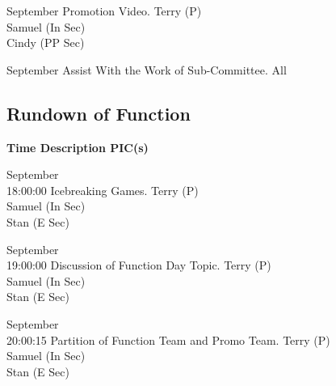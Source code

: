 \bTR{}
\eTD{} September
\eTD\bTD Promotion Video.
\eTD\bTD Terry (P) \\ Samuel (In Sec) \\ Cindy (PP Sec)
\eTD\eTR

\bTR{}
\eTD{} September
\eTD\bTD Assist With the Work of Sub-Committee.
\eTD\bTD All
\eTD\eTR

\eTABLEbody
\eTABLE

\pagebreak
\subsection{Rundown of Function}

\setupTABLE[c][1][width=1.25in]
\setupTABLE[c][2][width=3.5in]
\setupTABLE[c][3][width=1.25in]
\bTABLE
\bTABLEhead

\bTR\bTH    \bf{Time}
\eTH\bTH    \bf{Description}
\eTH\bTH    \bf{PIC(s)}
\eTH\eTR

\eTABLEhead
\bTABLEbody

\bTR{} September \\ 18:00:00
\eTD\bTD Icebreaking Games.
\eTD\bTD Terry (P) \\ Samuel (In Sec) \\ Stan (E Sec)
\eTD\eTR

\bTR{} September \\ 19:00:00
\eTD\bTD Discussion of Function Day Topic.
\eTD\bTD Terry (P) \\ Samuel (In Sec) \\ Stan (E Sec)
\eTD\eTR

\bTR{} September \\ 20:00:15
\eTD\bTD Partition of Function Team and Promo Team.
\eTD\bTD Terry (P) \\ Samuel (In Sec) \\ Stan (E Sec)
\eTD\eTR

\eTABLEbody
\eTABLE

\stopsection
\pagebreak
